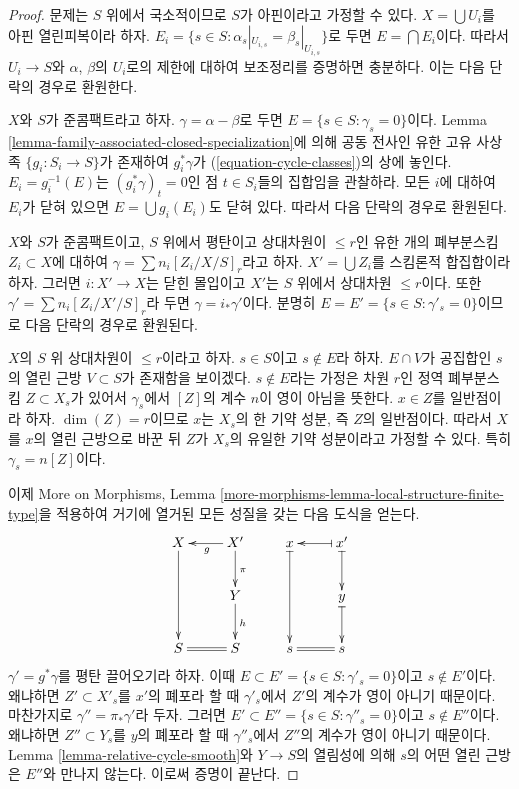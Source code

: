 \begin{proof}
문제는 $S$ 위에서 국소적이므로 $S$가 아핀이라고 가정할 수 있다.
$X = \bigcup U_i$를 아핀 열린피복이라 하자.
$E_i = \{s \in S : \alpha_s|_{U_{i, s}} = \beta_s|_{U_{i, s}}\}$로
두면 $E = \bigcap E_i$이다. 따라서 $U_i \to S$와 $\alpha$, $\beta$의
$U_i$로의 제한에 대하여 보조정리를 증명하면 충분하다. 이는 다음
단락의 경우로 환원한다.

\medskip\noindent
$X$와 $S$가 준콤팩트라고 하자. $\gamma = \alpha - \beta$로 두면
$E = \{s \in S : \gamma_s = 0\}$이다.
Lemma \ref{lemma-family-associated-closed-specialization}에 의해 공동
전사인 유한 고유 사상 족 $\{g_i : S_i \to S\}$가 존재하여
$g_i^*\gamma$가 (\ref{equation-cycle-classes})의 상에 놓인다.
$E_i = g_i^{-1}(E)$는 $(g_i^*\gamma)_t = 0$인 점 $t \in S_i$들의
집합임을 관찰하라. 모든 $i$에 대하여 $E_i$가 닫혀 있으면
$E = \bigcup g_i(E_i)$도 닫혀 있다. 따라서 다음 단락의 경우로
환원된다.

\medskip\noindent
$X$와 $S$가 준콤팩트이고, $S$ 위에서 평탄이고 상대차원이
$\leq r$인 유한 개의 폐부분스킴 $Z_i \subset X$에 대하여
$\gamma = \sum n_i[Z_i/X/S]_r$라고 하자. $X' = \bigcup Z_i$를
스킴론적 합집합이라 하자. 그러면 $i : X' \to X$는 닫힌 몰입이고
$X'$는 $S$ 위에서 상대차원 $\leq r$이다. 또한
$\gamma' = \sum n_i[Z_i/X'/S]_r$라 두면 $\gamma = i_*\gamma'$이다.
분명히 $E = E' = \{s \in S : \gamma'_s = 0\}$이므로 다음 단락의
경우로 환원된다.

\medskip\noindent
$X$의 $S$ 위 상대차원이 $\leq r$이라고 하자. $s \in S$이고
$s \not \in E$라 하자. $E \cap V$가 공집합인 $s$의 열린 근방
$V \subset S$가 존재함을 보이겠다. $s \not \in E$라는 가정은
차원 $r$인 정역 폐부분스킴 $Z \subset X_s$가 있어서 $\gamma_s$에서
$[Z]$의 계수 $n$이 영이 아님을 뜻한다. $x \in Z$를 일반점이라 하자.
$\dim(Z) = r$이므로 $x$는 $X_s$의 한 기약 성분, 즉 $Z$의 일반점이다.
따라서 $X$를 $x$의 열린 근방으로 바꾼 뒤 $Z$가 $X_s$의 유일한
기약 성분이라고 가정할 수 있다. 특히 $\gamma_s = n[Z]$이다.

\medskip\noindent
이제 More on Morphisms, Lemma
\ref{more-morphisms-lemma-local-structure-finite-type}을 적용하여 거기에
열거된 모든 성질을 갖는 다음 도식을 얻는다.
$$
\xymatrix{
X \ar[dd] & X' \ar[l]^g \ar[d]^\pi & x \ar@{|->}[dd] &
x' \ar@{|->}[l]  \ar@{|->}[d] \\
& Y \ar[d]^h & & y \ar@{|->}[d] \\
S \ar@{=}[r] & S & s & s \ar@{=}[l]
}
$$
$\gamma' = g^*\gamma$를 평탄 끌어오기라 하자. 이때
$E \subset E' = \{s \in S: \gamma'_s = 0\}$이고 $s \not \in E'$이다.
왜냐하면 $Z' \subset X'_s$를 $x'$의 폐포라 할 때 $\gamma'_s$에서
$Z'$의 계수가 영이 아니기 때문이다. 마찬가지로
$\gamma'' = \pi_*\gamma'$라 두자. 그러면
$E' \subset E'' = \{s \in S: \gamma''_s = 0\}$이고 $s \not \in E''$이다.
왜냐하면 $Z'' \subset Y_s$를 $y$의 폐포라 할 때 $\gamma''_s$에서
$Z''$의 계수가 영이 아니기 때문이다. Lemma
\ref{lemma-relative-cycle-smooth}와 $Y \to S$의 열림성에 의해
$s$의 어떤 열린 근방은 $E''$와 만나지 않는다. 이로써 증명이 끝난다.
\end{proof}

